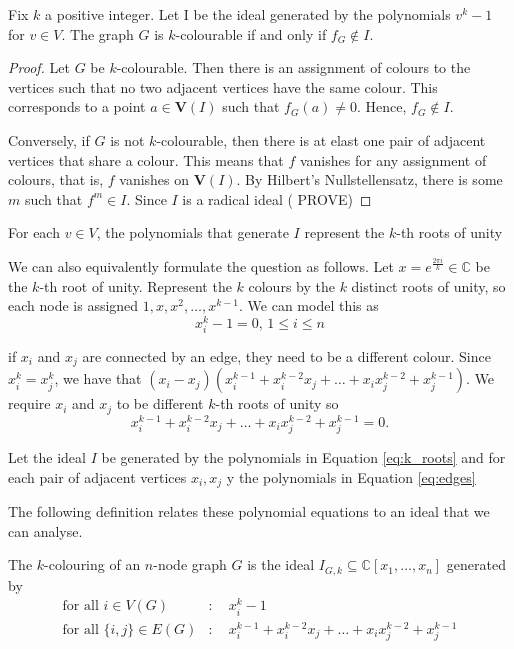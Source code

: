 \documentclass[../main.tex]{subfiles}
\begin{document}
    \begin{theorem}
        Fix $k$ a positive integer. Let I be the ideal generated by the polynomials $v^k-1$ for $v\in V$. The graph $G$ is $k$-colourable if and only if $f_G\notin I$.
        \begin{proof}
            Let $G$ be $k$-colourable. Then there is an assignment of colours to the vertices such that no two adjacent vertices have the same colour. This corresponds to a point $a\in \mathbf{V}(I)$ such that $f_G(a)\neq 0$. Hence, $f_G\notin I$.

            Conversely, if $G$ is not $k$-colourable, then there is at elast one pair of adjacent vertices that share a colour. This means that $f$ vanishes for any assignment of colours, that is, $f$ vanishes on $\mathbf{V}(I)$. By Hilbert's Nullstellensatz, there is some $m$ such that $f^m\in I$. Since $I$ is a radical ideal ({\color{red} PROVE})
        \end{proof}
    \end{theorem}

    For each $v\in V$, the polynomials that generate $I$ represent the $k$-th roots of unity

    We can also equivalently formulate the question as follows. Let $x=e^{\frac{2\pi i}{k}}\in \mathbb{C}$ be the $k$-th root of unity. Represent the $k$ colours by the $k$ distinct roots of unity, so each node is assigned $1, x, x^2,\dots,x^{k-1}$. We can model this as
    \begin{equation} \label{eq:k_roots}
        x_i^k-1=0,\, 1\leq i\leq n
    \end{equation}

    if $x_i$ and $x_j$ are connected by an edge, they need to be a different colour. Since $x_i^k = x_j^k$, we have that $(x_i-x_j)(x_i^{k-1} + x_i^{k-2}x_j+\dots+x_ix_j^{k-2}+x_j^{k-1})$. We require $x_i$ and $x_j$ to be different $k$-th roots of unity so 
    \begin{equation} \label{eq:edges}
        x_i^{k-1} + x_i^{k-2}x_j+\dots+x_ix_j^{k-2}+x_j^{k-1}=0.
    \end{equation}


    Let the ideal $I$ be generated by the polynomials in Equation \ref{eq:k_roots} and for each pair of adjacent vertices $x_i, x_j$ y the polynomials in Equation \ref{eq:edges}

    The following definition relates these polynomial equations to an ideal that we can analyse.

    \begin{definition}
        The $k$-colouring of an $n$-node graph $G$ is the ideal $I_{G,k}\subseteq \mathbb{C}[x_1,\dots,x_n]$ generated by 
        \begin{align*}
            \text{for all $i\in V(G)$}&: \quad x_i^k-1 \\
            \text{for all $\{i,j\}\in E(G)$}&: \quad x_i^{k-1} + x_i^{k-2}x_j+\dots+x_ix_j^{k-2}+x_j^{k-1}
        \end{align*}
    \end{definition}
\end{document}
